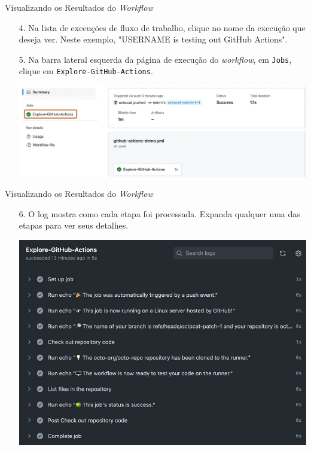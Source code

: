 \documentclass[t,serif]{beamer}
\begin{document}
	\begin{frame}{Visualizando os Resultados do \textit{Workflow}}
		\begin{enumerate}
			\item[4.] Na lista de execuções de fluxo de trabalho, clique no nome da execução que deseja ver. Neste exemplo, "USERNAME is testing out GitHub Actions".
			\item[5.] Na barra lateral esquerda da página de execução do \textit{workflow}, em \texttt{Jobs}, clique em \texttt{Explore-GitHub-Actions}.
			\begin{center}
				\includegraphics[width=\linewidth]{figs/3_8.png}
			\end{center}
		\end{enumerate}
	\end{frame}
	
	\begin{frame}{Visualizando os Resultados do \textit{Workflow}}
		\begin{enumerate}
			\item[6.] O log mostra como cada etapa foi processada. Expanda qualquer uma das etapas para ver seus detalhes.
			\begin{center}
				\includegraphics[width=0.8\linewidth]{figs/3_9.png}
			\end{center}
		\end{enumerate}
	\end{frame}
	
\end{document}
